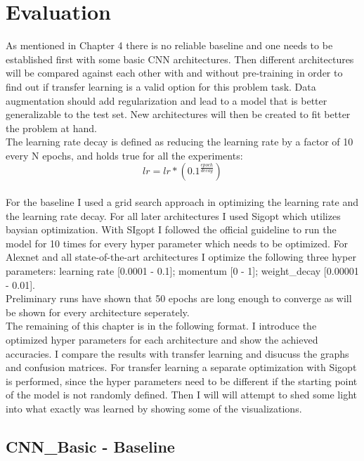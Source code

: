 \chapter{Evaluation}

As mentioned in Chapter 4 there is no reliable baseline and one needs to be established first with some basic CNN architectures. Then different architectures will be compared against each other with and without pre-training in order to find out if transfer learning is a valid option for this problem task. Data augmentation should add regularization and lead to a model that is better generalizable to the test set. New architectures will then be created to fit better the problem at hand. \\

The learning rate decay is defined as reducing the learning rate by a factor of 10 every N epochs, and holds true for all the experiments: \\

\[ lr = lr * (0.1^{\frac{epoch}{decay}}) \] \\

For the baseline I used a grid search approach in optimizing the learning rate and the learning rate decay. For all later architectures I used Sigopt which utilizes baysian optimization. With SIgopt I followed the official guideline to run the model for 10 times for every hyper parameter which needs to be optimized. For Alexnet and all state-of-the-art architectures I optimize the following three hyper parameters: learning rate [0.0001 - 0.1]; momentum [0 - 1]; weight\_decay [0.00001 - 0.01]. \\

Preliminary runs have shown that 50 epochs are long enough to converge as will be shown for every architecture seperately. \\

The remaining of this chapter is in the following format. I introduce the optimized hyper parameters for each architecture and show the achieved accuracies. I compare the results with transfer learning and disucuss the graphs and confusion matrices. For transfer learning a separate optimization with Sigopt is performed, since the hyper parameters need to be different if the starting point of the model is not randomly defined. Then I will will attempt to shed some light into what exactly was learned by showing some of the visualizations.

\section{CNN\_Basic - Baseline}


